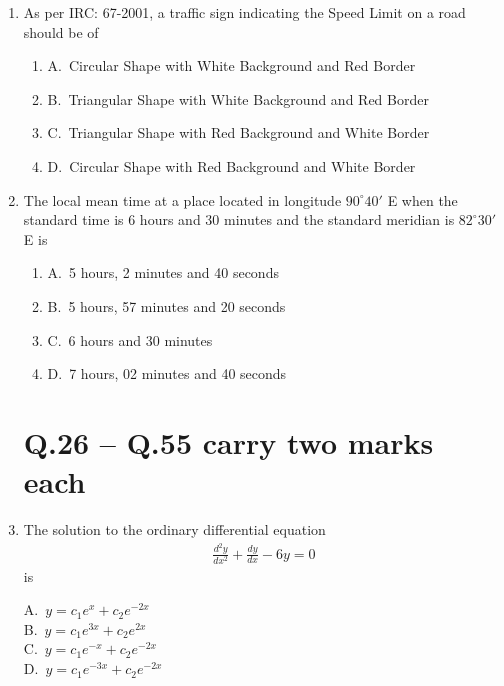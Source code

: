 \documentclass[journal,12pt,onecolumn]{IEEEtran}
\theoremstyle{remark}
\begin{document}
\begin{enumerate}
\noindent\item As per IRC: 67-2001, a traffic sign indicating the Speed Limit on a road should be of               
\hfill{}
\begin{enumerate}[label=]
    
\item A.\ Circular Shape with White Background and Red Border \\
\item B.\ Triangular Shape with White Background and Red Border \\
\item C.\ Triangular Shape with Red Background and White Border \\
\item D.\ Circular Shape with Red Background and White Border
\end{enumerate}

\noindent\item The local mean time at a place located in longitude $90^\circ40'$ E when the standard time is 6 hours and 30 minutes and the standard meridian is $82^\circ30'$ E is
\hfill{}
\begin{enumerate}[label=]
\item A.\ 5 hours, 2 minutes and 40 seconds \\
\item B.\ 5 hours, 57 minutes and 20 seconds \\
\item C.\ 6 hours and 30 minutes \\
\item D.\ 7 hours, 02 minutes and 40 seconds
\end{enumerate}

\raggedright
    
\section*{Q.26 -- Q.55 carry two marks each}

\noindent\item The solution to the ordinary differential equation
\begin{align*}
\frac{d^2y}{dx^2} + \frac{dy}{dx} - 6y = 0
\end{align*}
is
\hfill{}
\begin{multicols}{4}
A.\ $y = c_1 e^x + c_2 e^{-2x}$ \\
B.\ $y = c_1 e^{3x} + c_2 e^{2x}$ \\
C.\ $y = c_1 e^{-x} + c_2 e^{-2x}$ \\
D.\ $y = c_1 e^{-3x} + c_2 e^{-2x}$
\end{multicols}


\end{enumerate}
\end{document}
